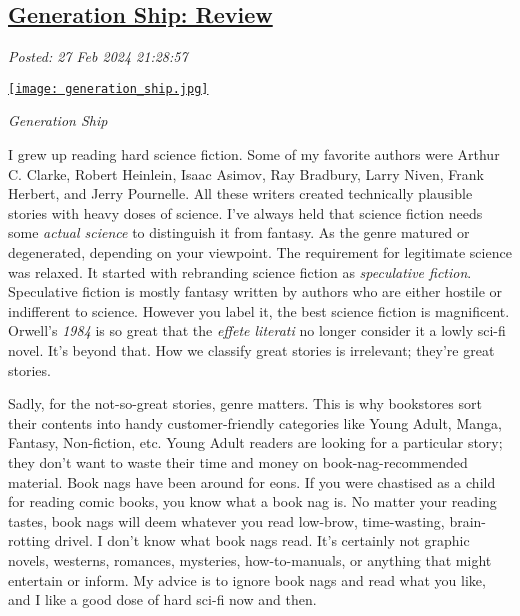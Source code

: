 %

\subsection*{\href{http://analyzethedatanotthedrivel.org/2024/02/27/generation-ship-review/}{Generation Ship: Review}}

\noindent\emph{Posted: 27 Feb 2024 21:28:57}
\vspace{6pt}

\captionsetup[floatingfigure]{labelformat=empty}
\begin{floatingfigure}[l]{0.22\textwidth}
 \centering
 \href{https://www.goodreads.com/book/show/63876699-generation-ship}{\texttt{[image: generation\_ship.jpg]}}
\caption[Micheal Mammay's \emph{Generation Ship}]{\emph{Generation Ship}}
\label{fig:8017x0}
\end{floatingfigure} I grew up reading hard science fiction. Some of my favorite authors were
Arthur C. Clarke, Robert Heinlein, Isaac Asimov, Ray Bradbury, Larry
Niven, Frank Herbert, and Jerry Pournelle. All these writers created
technically plausible stories with heavy doses of science. I've always
held that science fiction needs some \emph{actual science} to
distinguish it from fantasy. As the genre matured or degenerated,
depending on your viewpoint. The requirement for legitimate science was
relaxed. It started with rebranding science fiction as \emph{speculative
fiction}. Speculative fiction is mostly fantasy written by authors who
are either hostile or indifferent to science. However you label it, the
best science fiction is magnificent. Orwell's \emph{1984} is so great
that the \emph{effete literati} no longer consider it a lowly sci-fi
novel. It's beyond that. How we classify great stories is irrelevant;
they're great stories.

Sadly, for the not-so-great stories, genre matters. This is why
bookstores sort their contents into handy customer-friendly categories
like Young Adult, Manga, Fantasy, Non-fiction, etc. Young Adult readers
are looking for a particular story; they don't want to waste their time
and money on book-nag-recommended material. Book nags have been around
for eons. If you were chastised as a child for reading comic books, you
know what a book nag is. No matter your reading tastes, book nags will deem
 whatever you read low-brow, time-wasting,
brain-rotting drivel. I don't know what book nags read. It's certainly
not graphic novels, westerns, romances, mysteries, how-to-manuals, or
anything that might entertain or inform. My advice is to ignore book
nags and read what you like, and I like a good dose of hard sci-fi now
and then.

